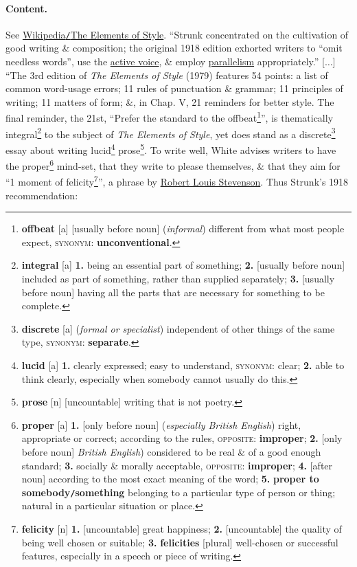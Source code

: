 \documentclass[oneside]{book}
\numberwithin{equation}{section}
\begin{document}
\paragraph*{Content.} See \href{https://en.wikipedia.org/wiki/The_Elements_of_Style}{Wikipedia\texttt{/}The Elements of Style}. ``Strunk concentrated on the cultivation of good writing \& composition; the original 1918 edition exhorted writers to ``omit needless words'', use the \href{https://en.wikipedia.org/wiki/Active_voice}{active voice}, \& employ \href{https://en.wikipedia.org/wiki/Parallelism_(grammar)}{parallelism} appropriately.'' [$\ldots$] ``The 3rd edition of \textit{The Elements of Style} (1979) features 54 points: a list of common word-usage errors; 11 rules of punctuation \& grammar; 11 principles of writing; 11 matters of form; \&, in Chap. V, 21 reminders for better style. The final reminder, the 21st, ``Prefer the standard to the offbeat\footnote{\textbf{offbeat} [a] [usually before noun] (\textit{informal}) different from what most people expect, \textsc{synonym}: \textbf{unconventional}.}'', is thematically integral\footnote{\textbf{integral} [a] \textbf{1.} being an essential part of something; \textbf{2.} [usually before noun] included as part of something, rather than supplied separately; \textbf{3.} [usually before noun] having all the parts that are necessary for something to be complete.} to the subject of \textit{The Elements of Style}, yet does stand as a discrete\footnote{\textbf{discrete} [a] (\textit{formal or specialist}) independent of other things of the same type, \textsc{synonym}: \textbf{separate}.} essay about writing lucid\footnote{\textbf{lucid} [a] \textbf{1.} clearly expressed; easy to understand, \textsc{synonym}: clear; \textbf{2.} able to think clearly, especially when somebody cannot usually do this.} prose\footnote{\textbf{prose} [n] [uncountable] writing that is not poetry.}. To write well, White advises writers to have the proper\footnote{\textbf{proper} [a] \textbf{1.} [only before noun] (\textit{especially British English}) right, appropriate or correct; according to the rules, \textsc{opposite}: \textbf{improper}; \textbf{2.} [only before noun] \textit{British English}) considered to be real \& of a good enough standard; \textbf{3.} socially \& morally acceptable, \textsc{opposite}: \textbf{improper}; \textbf{4.} [after noun] according to the most exact meaning of the word; \textbf{5.} \textbf{proper to somebody\texttt{/}something} belonging to a particular type of person or thing; natural in a particular situation or place.} mind-set, that they write to please themselves, \& that they aim for ``1 moment of felicity\footnote{\textbf{felicity} [n] \textbf{1.} [uncountable] great happiness; \textbf{2.} [uncountable] the quality of being well chosen or suitable; \textbf{3.} \textbf{felicities} [plural] well-chosen or successful features, especially in a speech or piece of writing.}'', a phrase by \href{https://en.wikipedia.org/wiki/Robert_Louis_Stevenson}{Robert Louis Stevenson}. Thus Strunk's 1918 recommendation:
\end{document}
